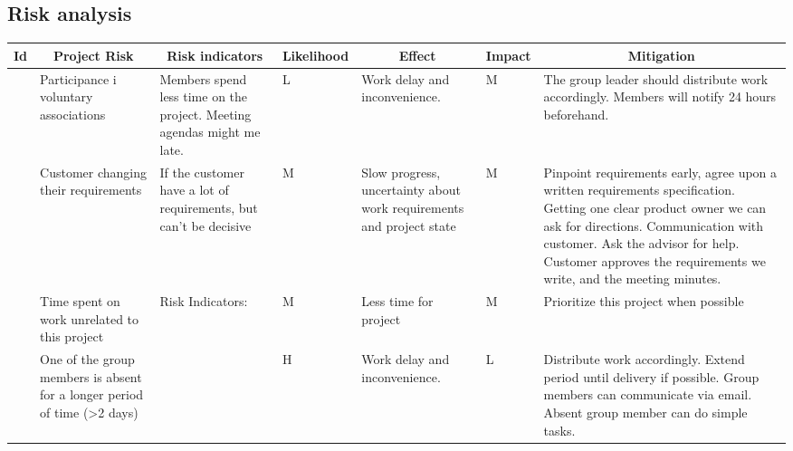 \begin{landscape}
\subsection{Risk analysis}

\centering
\begin{longtable}{| p{0.4cm} | p{4cm} | p{4cm} | p{2cm} | p{4cm} | p{1cm} | p{4cm} |}
	\hline
		\multicolumn{1}{|c|}{ Id}   &
        \multicolumn{1}{c|}{ Project Risk}  &
		\multicolumn{1}{c|}{ Risk indicators}  &
		\multicolumn{1}{c|}{ Likelihood} &
		\multicolumn{1}{c|}{ Effect} &
		\multicolumn{1}{c|}{ Impact} &
		\multicolumn{1}{c|}{ Mitigation} \\
		\hline \hline
	\endhead

	\newcounter{riskId}

	\stepcounter{riskId}
	\centering
		\arabic{riskId} &
        Participance i voluntary associations &
		Members spend less time on the project. Meeting agendas might me late. &
		\centering L &
		Work delay and inconvenience. &
		\centering M &
		The group leader should distribute work accordingly. Members will notify 24 hours beforehand. \\
	\hline

	\stepcounter{riskId}
	\centering
		\arabic{riskId} &
        Customer changing their requirements &
		If the customer have a lot of requirements, but can’t be decisive &
		\centering M &
		Slow progress, uncertainty about work requirements and project state &
		\centering  M &
		Pinpoint requirements early, agree upon a written requirements
		specification. Getting one clear product owner we can ask for
		directions.  Communication with customer. Ask the advisor for help.
		Customer approves the requirements we write, and the meeting minutes.
		\\
	\hline

	\stepcounter{riskId}
	\centering
		\arabic{riskId} &
        Time spent on work unrelated to this project &
		Risk Indicators: &
		\centering M &
		Less time for project &
		\centering M & 
		Prioritize this project when possible \\
	\hline

	\stepcounter{riskId}
	\centering
		\arabic{riskId} &
        One of the group members is absent for a longer period of time (>2 days) &
		& \centering H &
		Work delay and inconvenience. &
		\centering  L &
		Distribute work accordingly. Extend period until delivery if possible.
		Group members can communicate via email. Absent group member can do
		simple tasks. \\
	\hline


\end{longtable}
\end{landscape}
